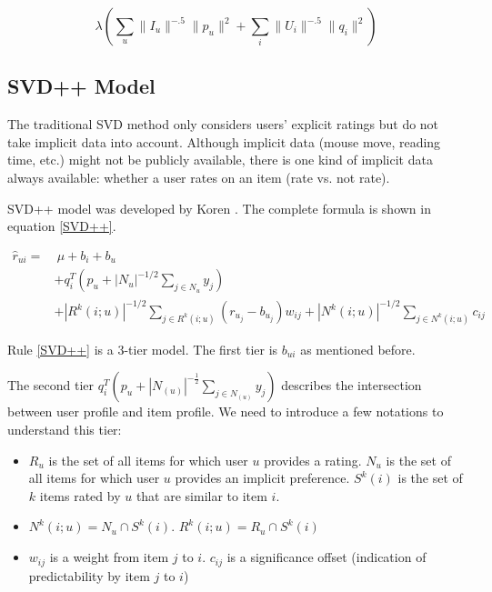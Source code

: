 \documentclass[letter paper, 11pt]{article}
\begin{document}
	\begin{equation}
		\label{eqn:modified-weighted-lambda}
		\lambda (\sum_u \|I_u\|^{-.5} \|p_u\|^2 + \sum_i \|U_i\|^{-.5} \|q_i\|^2)
	\end{equation}

	\subsection{SVD++ Model}
	
	The traditional SVD method only considers users' explicit ratings but do not take implicit data into account. Although implicit data (mouse move, reading time, etc.) might not be publicly available, there is one kind of implicit data always available: whether a user rates on an item (rate vs. not rate). 
	
	
	SVD++ model was developed by Koren \cite{korenFactorization}. The complete formula is shown in equation \ref{SVD++}. 
	
	\begin{equation} \label{SVD++}
		\tag*{SVD++ Model in Three Tiers}
		\begin{split}
			\hat{r}_{ui} =& \ \mu + b_i + b_u \\ 
			& + q_i^T  (p_u + |N_u|^{-1/2} \sum_{j \in N_u}y_j) \\ 
			& + |R^k(i; u)|^{-1/2} \sum_{j \in R^k(i; u)} (r_{u_j} - b_{u_j}) w_{ij} + |N^k(i; u)|^{-1/2} \sum_{j \in N^k(i; u)} c_{ij}
		\end{split}
	\end{equation}
	
	
	Rule \ref{SVD++} is a 3-tier model. The first tier is $b_{ui}$ as mentioned before. 
	
	
	The second tier $q_i^T  (p_u + |N_{(u)}|^{-\frac{1}{2}} \sum_{j \in N_{(u)}}y_j)$ describes the intersection between user profile and item profile. We need to introduce a few notations to understand this tier:
	\begin{itemize}
		\item $R_u$ is the set of all items for which user $u$ provides a rating. $N_u$ is the set of all items for which user $u$ provides an implicit preference. $S^k(i)$ is the set of $k$ items rated by $u$ that are similar to item $i$.
		
		\item $N^k{(i; u)} = N_u \cap S^k (i)$. $R^k{(i; u)} = R_u \cap S^k (i)$
		
		\item $w_{ij}$ is a weight from item $j$ to $i$. $c_{ij}$ is a significance offset (indication of predictability by item $j$ to $i$)
	\end{itemize}
	
\end{document}
